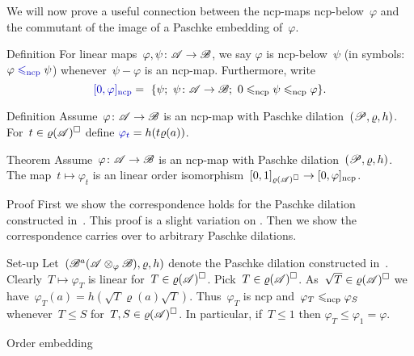 \documentclass[b]{subfiles}
\begin{document}
\begin{parsec}%
\begin{point}%
We will now prove a useful connection between
    the ncp-maps ncp-below~$\varphi$
    and the commutant of the image of a Paschke embedding of~$\varphi$.
\end{point}
\begin{point}{Definition}%
For linear  maps~$\varphi, \psi\colon \mathscr{A} \to \mathscr{B}$,
    we say $\varphi$ is ncp-below~$\psi$
    (in symbols:~$\varphi \mathrel{\Define{\leq_\ncp}} \psi$)
    whenever~$\psi - \varphi$ is an ncp-map.
    Furthermore, write
    \begin{equation*}
    \Define{[0,\varphi]_\ncp} =\  
        \{\psi; \ \psi \colon \scrA \to \scrB;
            \ 0 \leq_\ncp\psi \leq_\ncp \varphi \}.
    \end{equation*}
\end{point}
\begin{point}{Definition}%
    Assume~$\varphi\colon \mathscr{A} \to \mathscr{B}$ is an ncp-map with Paschke
        dilation~$(\mathscr{P}, \varrho, h)$.
    For~$t \in \varrho(\mathscr{A})^\square$
    define $\Define{\varphi_t} = h(t \varrho(a))$.
\end{point}
\begin{point}[paschke-correspondence]{Theorem}%
Assume~$\varphi\colon \mathscr{A} \to \mathscr{B}$ is an ncp-map
    with Paschke dilation~$(\mathscr{P}, \varrho, h)$.
The map~$t \mapsto \varphi_t$ is an linear
order isomorphism~$[0,1]_{\varrho(\mathscr{A})^\square} \to [0,\varphi]_{\mathrm{ncp}}$.
\begin{point}{Proof}
First we show the correspondence holds
    for the Paschke dilation constructed in~.
This proof is a slight variation on \cite[Prop.~5.4]{paschke}.
Then we show the correspondence carries over to arbitrary Paschke dilations.
\begin{point}{Set-up}%
Let~$(\mathscr{B}^a(\mathscr{A} \otimes_\varphi \mathscr{B}), \varrho, h)$
    denote the Paschke dilation constructed in~.
Clearly~$T \mapsto \varphi_T$ is linear
    for~$T \in \varrho(\mathscr{A})^\square$.
Pick~$T \in \varrho(\mathscr{A})^\square$.
As~$\sqrt{T} \in \varrho(\mathscr{A})^\square$
    we have~$\varphi_T(a) = h(\sqrt{T} \varrho(a)\sqrt{T})$.
    Thus~$\varphi_T$ is ncp
    and~$\varphi_T \mathrel{\leqslant_{\mathrm{ncp}}} \varphi_S$
    whenever~$T\leq S$ for~$T,S \in \varrho(\mathscr{A})^\square$.
In particular, if~$T\leq 1$ then $\varphi_T \leq \varphi_1 = \varphi$.
\end{point}
\begin{point}{Order embedding}%

\end{point}
\end{point}
\end{point}
\end{parsec}
\end{document}
